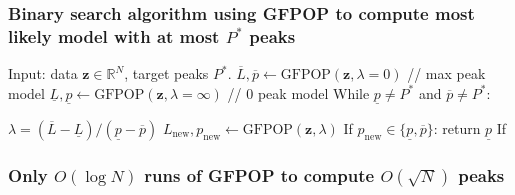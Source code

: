 \documentclass{beamer}
\newcommand{\RR}{\mathbb R}
\begin{document}
\begin{frame}
  \frametitle{Binary search algorithm using GFPOP to compute most
    likely model with at most $P^*$ peaks}
  \begin{algorithmic}[1]
  \STATE Input: data $\mathbf z\in\RR^N$, target peaks $P^*$.
  \STATE $\overline L,\overline p \gets \text{GFPOP}(\mathbf z, \lambda=0)$ // max peak model
  \STATE $\underline L,\underline p \gets \text{GFPOP}(\mathbf z, \lambda=\infty)$ // 0 peak model
  \STATE While $\underline p\neq P^*$ and $\overline p\neq P^*$:
  \begin{ALC@g}
    \STATE $\lambda=(\overline L-\underline L)/(\underline p-\overline p)$
    \STATE $L_{\text{new}},p_{\text{new}}\gets\text{GFPOP}(\mathbf z, \lambda)$
    \STATE If $p_{\text{new}}\in\{\underline p, \overline p\}$: return $\underline p$
    \STATE If 
  \end{ALC@g}
  \end{algorithmic}
\end{frame}

\begin{frame}
  \frametitle{Only $O(\log N)$ runs of GFPOP to compute $O(\sqrt N)$
    peaks}
   

\end{frame}
\end{document}
